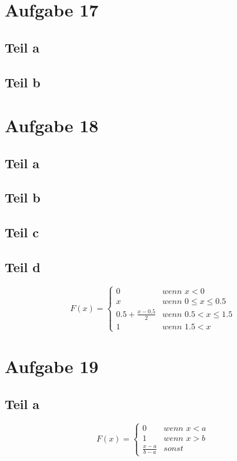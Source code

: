 \documentclass[10pt,a4paper]{article}
\begin{document}
\section{Aufgabe 17}

\subsection{Teil a}

\subsection{Teil b}

\section{Aufgabe 18}

\subsection{Teil a}

\subsection{Teil b}

\subsection{Teil c}

\subsection{Teil d}
\begin{equation}
  F(x) = 
  \begin{cases}
    0 & \textit{wenn $x < 0$}\\
    x & \textit{wenn $0 \le x \le 0.5$}\\
    0.5 + \frac{x - 0.5}{2} & \textit{wenn $0.5 < x \le 1.5$}\\
    1 & \textit{wenn $1.5 < x$}
  \end{cases}
\end{equation}

\section{Aufgabe 19}

\subsection{Teil a}
\begin{equation}
  F(x) = 
  \begin{cases}
    0 & \textit{wenn $x < a$}\\
    1 & \textit{wenn $x > b$}\\
    \frac{x - a}{b - a} & \textit{sonst}
  \end{cases}
\end{equation}
\end{document}
